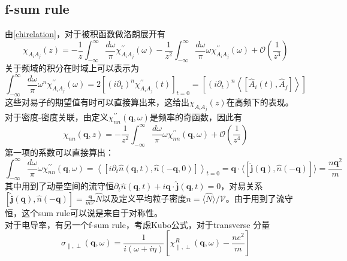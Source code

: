 \documentclass[10pt,openany]{book}
\theoremstyle{thmstyle} %
\theoremstyle{defstyle} %
\theoremstyle{prostyle} %
\begin{document}
\subsection{f-sum rule}
由\eqref{chirelation}，对于被积函数做洛朗展开有
\begin{equation}
  \chi_{A_i A_j}(z)=-\frac{1}{z} \int_{-\infty}^{\infty} \frac{d \omega}{\pi} \chi_{A_i A_j}^{\prime \prime}(\omega)-\frac{1}{z^2} \int_{-\infty}^{\infty} \frac{d \omega}{\pi} \omega \chi_{A_i A_j}^{\prime \prime}(\omega)+\mathcal{O}\left(\frac{1}{z^3}\right)
\end{equation}
关于频域的积分在时域上可以表示为
\begin{equation*}
  \int_{-\infty}^{\infty} \frac{d \omega}{\pi} \omega^n \chi_{A_i A_j}^{\prime \prime}(\omega)=2\left[\left(i \partial_t\right)^n \chi_{A_i A_j}^{\prime \prime}(t)\right]_{t=0}=\left[\left(i \partial_t\right)^n\left\langle\left[\hat{A}_i(t), \hat{A}_j\right]\right\rangle\right]
\end{equation*}
这些对易子的期望值有时可以直接算出来，这给出$ \chi_{A_i A_j}(z) $在高频下的表现。\\
对于密度-密度关联，由定义$ \chi_{n n}^{\prime \prime}(\mathbf{q}, \omega) $是频率的奇函数，因此有
\begin{equation}
  \chi_{n n}(\mathbf{q}, z)=-\frac{1}{z^2} \int_{-\infty}^{\infty} \frac{d \omega}{\pi} \omega \chi_{n n}^{\prime \prime}(\mathbf{q}, \omega)+\mathcal{O}\left(\frac{1}{z^4}\right)
\end{equation}  
第一项的系数可以直接算出：
\begin{equation}
  \int_{-\infty}^{\infty} \frac{d \omega}{\pi} \omega \chi_{n n}^{\prime \prime}(\mathbf{q}, \omega)=\left\langle\left[i \partial_t \hat{n}(\mathbf{q}, t), \hat{n}(-\mathbf{q}, 0)\right]\right\rangle_{t=0}=\mathbf{q} \cdot\langle[\hat{\mathbf{j}}(\mathbf{q}), \hat{n}(-\mathbf{q})]\rangle=\frac{n \mathbf{q}^2}{m}
\end{equation}
其中用到了动量空间的流守恒$ \partial_t \hat{n}(\mathbf{q}, t)+i \mathbf{q} \cdot \hat{\mathbf{j}}(\mathbf{q}, t)=0 $，对易关系$ [\hat{\mathbf{j}}(\mathbf{q}), \hat{n}(-\mathbf{q})]=\frac{\mathbf{q}}{m \mathcal{V}} \hat{N} $以及定义平均粒子密度$ n=\langle\hat{N}\rangle / \mathcal{V} $。由于用到了流守恒，这个sum rule可以说是来自于对称性。\\
对于电导率，有另一个f-sum rule，考虑Kubo公式，对于transverse 分量
\begin{equation*}
  \sigma_{\|, \perp}(\mathbf{q}, \omega)=\frac{1}{i(\omega+i \eta)}\left[\chi_{\|, \perp}^R(\mathbf{q}, \omega)-\frac{n e^2}{m}\right]
\end{equation*}
\end{document}
